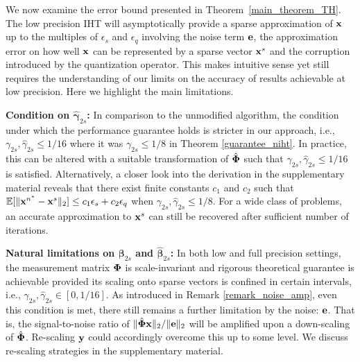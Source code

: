 \documentclass{article}
\begin{document}
We now examine the error bound presented in Theorem~\ref{main_theorem_TH}. The low precision IHT will asymptotically provide a sparse approximation of ${\bf x}$ up to the multiples of $ {\epsilon}_s$ and $ {\epsilon}_q$ involving the noise term ${\bf e}$, the approximation error on how well ${\bf x}$ can be represented by a sparse vector ${\bf x}^s$ and the corruption introduced by the quantization operator. This makes intuitive sense yet still requires the understanding of our limits on the accuracy of results achievable at low precision. Here we highlight the main limitations.

{\bf Condition on $\hat{\boldsymbol{\gamma}}_{2s}$:} In comparison to the unmodified algorithm, the condition under which the performance guarantee holds is stricter in our approach, i.e., ${\gamma}_{2s}, \hat{\gamma}_{2s}\leq 1/16$ where it was ${\gamma}_{2s}\leq 1/8$ in Theorem \ref{guarantee_niht}. In practice, this can be altered with a suitable transformation of $\hat{\bf \Phi}$ such that ${\gamma}_{2s}, \hat{\gamma}_{2s}\leq 1/16$ is satisfied. Alternatively, a closer look into the derivation in the supplementary material reveals that there exist finite constants $c_1$ and $c_2$ such that $\mathbb{E}[\|{\bf x}^{n^*}-{\bf x}^s \|_2] \leq c_1\epsilon_s + c_2\epsilon_q$ when ${\gamma}_{2s}, \hat{\gamma}_{2s}\leq 1/8$. For a wide class of problems, an accurate approximation to ${\bf x}^s$ can still be recovered after sufficient number of iterations.


{\bf Natural limitations on ${\boldsymbol{\beta}}_{2s}$ and $\hat{\boldsymbol{\beta}}_{2s}$:} In both low and full precision settings, the measurement matrix ${\bf \Phi}$ is scale-invariant and rigorous theoretical guarantee is achievable provided its scaling onto sparse vectors is confined in certain intervals, i.e., ${\gamma}_{2s}, \hat{\gamma}_{2s}\in [0, 1/16]$. As introduced in Remark \ref{remark_noise_amp}, even this condition is met, there still remains a further limitation by the noise: ${\bf e}$. That is, the signal-to-noise ratio of $\|\hat{\bf \Phi} {\bf x} \|_2/\|{\bf e} \|_2$ will be amplified upon a down-scaling of $\hat{\bf \Phi}$. Re-scaling ${\bf y}$ could accordingly overcome this up to some level. 
{We discuss re-scaling strategies in the supplementary material.}
\end{document}
